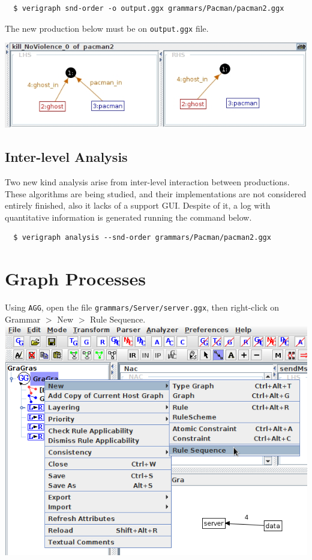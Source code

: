 \documentclass[12pt]{article}
\newenvironment{tutorialstep}
	{\hspace{-\parindent}\begin{minipage}{\textwidth}}
    {\vspace{.3cm}\end{minipage}}
\begin{document}
\begin{verbatim}
  $ verigraph snd-order -o output.ggx grammars/Pacman/pacman2.ggx
\end{verbatim}

The new production below must be on \texttt{output.ggx} file.

{\noindent\centering\includegraphics[scale = 0.5]{img/snd-order/kill.png}\\}

\subsection{Inter-level Analysis}

Two new kind analysis arise from inter-level interaction between productions.
These algorithms are being studied, and their implementations are not considered entirely finished, also it lacks of a support GUI.
Despite of it, a log with quantitative information is generated running the command below.

\begin{verbatim}
  $ verigraph analysis --snd-order grammars/Pacman/pacman2.ggx
\end{verbatim}

\pagebreak

\section{Graph Processes}

\begin{tutorialstep}
  Using \texttt{AGG}, open the file \texttt{grammars/Server/server.ggx}, then right-click on Grammar $>$ New $>$ Rule Sequence. \\

  \noindent
  \centering
  \includegraphics[scale = 0.6]{img/concurrent-rules/rule-sequence_01.png}
\end{tutorialstep}
\end{document}
